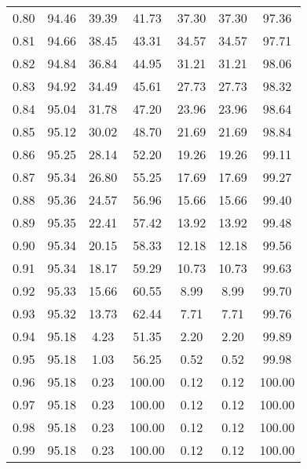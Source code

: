 \begin{tabular}{|c|c|c|c|c|c|c|}
      0.80 &     94.46 &     39.39 &      41.73 &   37.30 &      37.30 &         97.36 \\
      0.81 &     94.66 &     38.45 &      43.31 &   34.57 &      34.57 &         97.71 \\
      0.82 &     94.84 &     36.84 &      44.95 &   31.21 &      31.21 &         98.06 \\
      0.83 &     94.92 &     34.49 &      45.61 &   27.73 &      27.73 &         98.32 \\
      0.84 &     95.04 &     31.78 &      47.20 &   23.96 &      23.96 &         98.64 \\
      0.85 &     95.12 &     30.02 &      48.70 &   21.69 &      21.69 &         98.84 \\
      0.86 &     95.25 &     28.14 &      52.20 &   19.26 &      19.26 &         99.11 \\
      0.87 &     95.34 &     26.80 &      55.25 &   17.69 &      17.69 &         99.27 \\
      0.88 &     95.36 &     24.57 &      56.96 &   15.66 &      15.66 &         99.40 \\
      0.89 &     95.35 &     22.41 &      57.42 &   13.92 &      13.92 &         99.48 \\
      0.90 &     95.34 &     20.15 &      58.33 &   12.18 &      12.18 &         99.56 \\
      0.91 &     95.34 &     18.17 &      59.29 &   10.73 &      10.73 &         99.63 \\
      0.92 &     95.33 &     15.66 &      60.55 &    8.99 &       8.99 &         99.70 \\
      0.93 &     95.32 &     13.73 &      62.44 &    7.71 &       7.71 &         99.76 \\
      0.94 &     95.18 &      4.23 &      51.35 &    2.20 &       2.20 &         99.89 \\
      0.95 &     95.18 &      1.03 &      56.25 &    0.52 &       0.52 &         99.98 \\
      0.96 &     95.18 &      0.23 &     100.00 &    0.12 &       0.12 &        100.00 \\
      0.97 &     95.18 &      0.23 &     100.00 &    0.12 &       0.12 &        100.00 \\
      0.98 &     95.18 &      0.23 &     100.00 &    0.12 &       0.12 &        100.00 \\
      0.99 &     95.18 &      0.23 &     100.00 &    0.12 &       0.12 &        100.00 \\
\bottomrule
\end{tabular}

